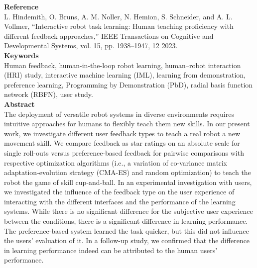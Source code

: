 \documentclass[report.tex]{subfiles}
\begin{document}
\noindent\textbf{Reference} \\
\cite{hindemith_interactive_2023} L. Hindemith, O. Bruns, A. M. Noller, N. Hemion, S. Schneider, and A. L. Vollmer, “Interactive robot task learning: Human teaching proficiency with different feedback approaches,” IEEE Transactions on Cognitive and Developmental Systems, vol. 15, pp. 1938–1947, 12 2023. \\


\noindent\textbf{Keywords} \\
Human feedback, human-in-the-loop robot learning, human–robot interaction (HRI) study,
interactive machine learning (IML), learning from demonstration, preference learning,
Programming by Demonstration (PbD), radial basis function network (RBFN), user study.
   \\

\noindent\textbf{Abstract} \\
The deployment of versatile robot systems in diverse environments requires intuitive approaches for
humans to flexibly teach them new skills. In our present work, we investigate different user
feedback types to teach a real robot a new movement skill. We compare feedback as star ratings on
an absolute scale for single roll-outs versus preference-based feedback for pairwise comparisons
with respective optimization algorithms (i.e., a variation of co-variance matrix adaptation-evolution
strategy (CMA-ES) and random optimization) to teach the robot the game of skill cup-and-ball. In
an experimental investigation with users, we investigated the influence of the feedback type on the
user experience of interacting with the different interfaces and the performance of the learning
systems. While there is no significant difference for the subjective user experience between the
conditions, there is a significant difference in learning performance. The preference-based system
learned the task quicker, but this did not influence the users’ evaluation of it. In a follow-up study,
we confirmed that the difference in learning performance indeed can be attributed to the human
users’ performance. \\
\end{document}

